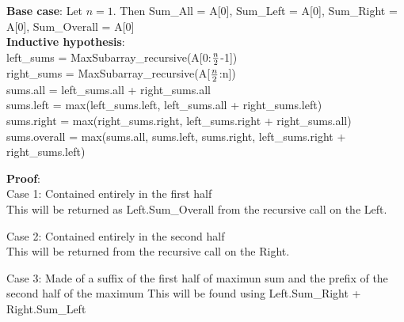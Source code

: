 \documentclass[a4paper,10pt]{article}
\begin{document}
		{\bf Base case}: Let $n=1$. Then Sum\_All = A[0], Sum\_Left = A[0], Sum\_Right = A[0], Sum\_Overall = A[0]\\

		{\bf Inductive hypothesis}:\\
			left_sums = MaxSubarray_recursive(A[0:$n \over 2$-1])\\
			right_sums = MaxSubarray_recursive(A[$n \over 2$:n])\\
			sums.all = left_sums.all + right_sums.all\\
			sums.left = max(left_sums.left, left_sums.all + right_sums.left)\\
			sums.right = max(right_sums.right, left_sums.right + right_sums.all)
			sums.overall = max(sums.all, sums.left, sums.right, left_sums.right + right_sums.left)

		{\bf Proof}:\\
			Case 1: Contained entirely in the first half\\
				This will be returned as Left.Sum_Overall from the recursive call on the Left.

			Case 2: Contained entirely in the second half\\
				This will be returned from the recursive call on the Right.

			Case 3: Made of a suffix of the first half of maximun sum and the prefix of the second half of the maximum
				This will be found using Left.Sum\_Right + Right.Sum\_Left


% 
% 
% 
% 
% 
% 
% 
\end{document}
